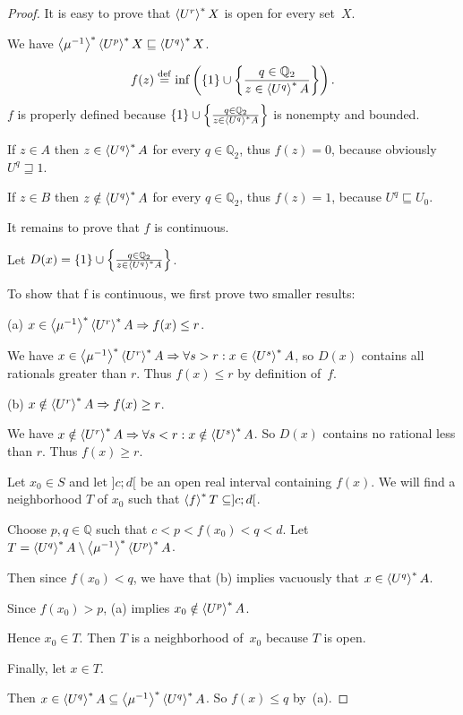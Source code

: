 \begin{proof}
It is easy to prove that $\left\langle U^r\right\rangle ^{\ast}X$ is open for every set~$X$.

We have $\left\langle \mu^{-1}\right\rangle ^{\ast}\left\langle U^p\right\rangle ^{\ast}X\sqsubseteq\left\langle U^q\right\rangle ^{\ast}X$.

\[ f (z) \overset{\mathrm{def}}{=} \inf \left( \{ 1 \} \cup \left\{ \frac{ q \in
   \mathbb{Q}_2 }{ z \in \left\langle U^q\right\rangle ^{\ast}
   A }\right\} \right). \]
$f$ is properly defined because $\{ 1 \} \cup \left\{ \frac{ q \in \mathbb{Q}_2
}{ z \in \left\langle U^q\right\rangle ^{\ast} A }\right\}$ is
nonempty and bounded.

If $z \in A$ then $z \in \left\langle U^q\right\rangle ^{\ast} A$ for every $q \in
\mathbb{Q}_2$, thus $f (z) = 0$, because obviously $U^q \sqsupseteq 1$.

If $z \in B$ then $z \notin \left\langle U^q\right\rangle ^{\ast} A$ for every $q \in
\mathbb{Q}_2$, thus $f (z) = 1$, because $U^q \sqsubseteq U_0$.

It remains to prove that $f$ is continuous.

Let $D (x) = \{ 1 \} \cup \left\{ \frac{ q \in \mathbb{Q}_2 }{
z \in \left\langle U^q\right\rangle ^{\ast} A }\right\}$.

To show that f is continuous, we first prove two smaller results:

(a) $x\in\left\langle \mu^{-1}\right\rangle ^{\ast}\left\langle U^r\right\rangle ^{\ast}A \Rightarrow f(x)\leq r$.

We have $x\in\left\langle \mu^{-1}\right\rangle ^{\ast}\left\langle U^r\right\rangle ^{\ast}A \Rightarrow \forall s>r:x\in\left\langle U^s\right\rangle ^{\ast}A$,
so $D(x)$ contains all rationals greater than $r$. Thus $f(x)\leq r$ by definition of~$f$.

(b) $x\notin\left\langle U^r\right\rangle ^{\ast}A \Rightarrow f(x)\geq r$.

We have $x\notin\left\langle U^r\right\rangle ^{\ast}A \Rightarrow \forall s<r:x\notin\left\langle U^s\right\rangle ^{\ast}A$.
So $D(x)$ contains no rational less than $r$. Thus $f(x)\geq r$.

Let $x_0\in S$ and let $]c;d[$ be an open real interval containing $f(x)$.
We will find a neighborhood $T$ of $x_0$ such that $\left\langle f\right\rangle ^{\ast}T\subseteq]c;d[$.

Choose $p,q\in\mathbb{Q}$ such that $c < p < f(x_0) < q < d$. Let $T=\left\langle U^q\right\rangle ^{\ast}A\setminus\left\langle \mu^{-1}\right\rangle ^{\ast}\left\langle U^p\right\rangle ^{\ast}A$.

Then since $f(x_0)<q$, we have that (b) implies vacuously that $x\in\left\langle U^q\right\rangle ^{\ast}A$.

Since $f(x_0)>p$, (a) implies $x_0\notin\left\langle U^p\right\rangle ^{\ast}A$.

Hence $x_0\in T$. Then $T$ is a neighborhood of~$x_0$ because $T$ is open.

Finally, let $x\in T$.

Then $x\in\left\langle U^q\right\rangle ^{\ast}A\subseteq\left\langle \mu^{-1}\right\rangle ^{\ast}\left\langle U^q\right\rangle ^{\ast}A$. So $f(x)\leq q$ by~(a).


\end{proof}

